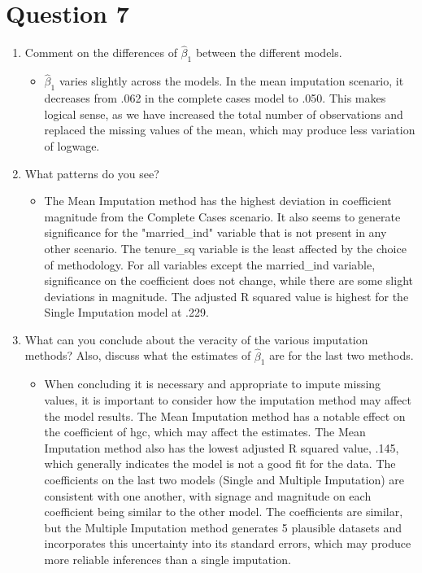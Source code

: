 \documentclass{article}
\begin{document}
\section*{Question 7}
\begin{enumerate}
    \item Comment on the differences of $\hat{\beta}_1$ between the different models. 
    \begin{itemize}
        \item $\hat{\beta}_1$ varies slightly across the models. In the mean imputation scenario, it decreases from .062 in the complete cases model to .050. This makes logical sense, as we have increased the total number of observations and replaced the missing values of the mean, which may produce less variation of logwage. 
    \end{itemize}
    \item What patterns do you see? 
    \begin{itemize}
        \item The Mean Imputation method has the highest deviation in coefficient magnitude from the Complete Cases scenario. It also seems to generate significance for the "married\_ind" variable that is not present in any other scenario. The tenure\_sq variable is the least affected by the choice of methodology. For all variables except the married\_ind variable, significance on the coefficient does not change, while there are some slight deviations in magnitude. The adjusted R squared value is highest for the Single Imputation model at .229.
    \end{itemize}
    \item What can you conclude about the veracity of the various imputation methods? Also, discuss what the estimates of $\hat{\beta}_1$ are for the last two methods.
    \begin{itemize}
        \item When concluding it is necessary and appropriate to impute missing values, it is important to consider how the imputation method may affect the model results. The Mean Imputation method has a notable effect on the coefficient of hgc, which may affect the estimates. The Mean Imputation method also has the lowest adjusted R squared value, .145, which generally indicates the model is not a good fit for the data.  The coefficients on the last two models (Single and Multiple Imputation) are consistent with one another, with signage and magnitude on each coefficient being similar to the other model. The coefficients are similar, but the Multiple Imputation method generates 5 plausible datasets and incorporates this uncertainty into its standard errors, which may produce more reliable inferences than a single imputation. 
    \end{itemize}
\end{enumerate}
\end{document}
